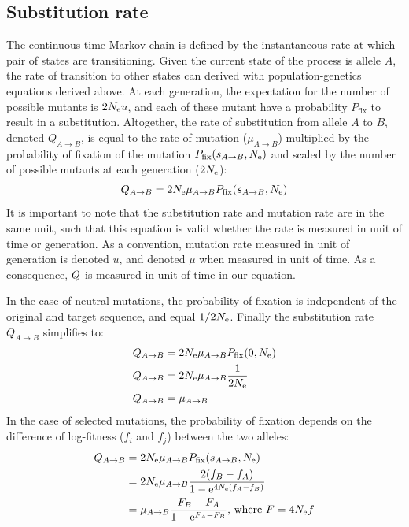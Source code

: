 \subsection{Substitution rate}
The continuous-time Markov chain is defined by the instantaneous rate at which pair of states are transitioning.
Given the current state of the process is allele $A$, the rate of transition to other states can derived with population-genetics equations derived above.
At each generation, the expectation for the number of possible mutants is $2N_{\textrm{e}} u$, and each of these mutant have a probability $P_{\mathrm{fix}}$ to result in a \gls{substitution}.
Altogether, the rate of \gls{substitution} from \gls{allele} $A$ to $B$, denoted $Q_{A \to B}$, is equal to the rate of mutation ($\mu_{A \to B}$) multiplied by the probability of fixation of the mutation $P_{\mathrm{fix}}(s_{A \to B}, N_{\textrm{e}})$ and scaled by the number of possible mutants at each generation ($2N_{\textrm{e}}$):
\begin{align}
Q_{A \to B} & = 2 N_{\textrm{e}} \mu_{A \to B}  P_{\mathrm{fix}}(s_{A \to B}, N_{\textrm{e}}) \\
\end{align}
It is important to note that the \gls{substitution} rate and mutation rate are in the same unit, such that this equation is valid whether the rate is measured in unit of time or generation.
As a convention, mutation rate measured in unit of generation is denoted $u$, and denoted $\mu$ when measured in unit of time. As a consequence, $Q$ is measured in unit of time in our equation.

In the case of \gls{neutral} mutations, the probability of fixation is independent of the original and target sequence, and equal $1/2 N_{\textrm{e}}$. Finally the substitution rate $Q_{A \to B}$ simplifies to: 
\begin{align}
Q_{A \to B} & = 2 N_{\textrm{e}} \mu_{A \to B}  P_{\mathrm{fix}}(0, N_{\textrm{e}}) \\
Q_{A \to B} & = 2 N_{\textrm{e}} \mu_{A \to B} \dfrac{1}{2N_{\textrm{e}}} \\
Q_{A \to B} & =  \mu_{A \to B}
\end{align}
In the case of selected mutations, the probability of fixation depends on the difference of log-fitness ($f_i$ and $f_j$) between the two alleles:
\begin{align}
Q_{A \to B} & = 2 N_{\textrm{e}} \mu_{A \to B} P_{\mathrm{fix}}(s_{A \to B}, N_{\textrm{e}}) \\
			& = 2 N_{\textrm{e}} \mu_{A \to B}  \dfrac{2(f_{B} - f_{A})}{1 - \mathrm{e}^{4N_{\textrm{e}}(f_{A} - f_{B})} } \\
			& = \mu_{A \to B} \dfrac{F_{B} - F_{A}}{1 - \mathrm{e}^{F_{A} - F_{B}} }\text{, where } F = 4N_{\textrm{e}} f \label{eq:sub-transion-rates}
\end{align}


